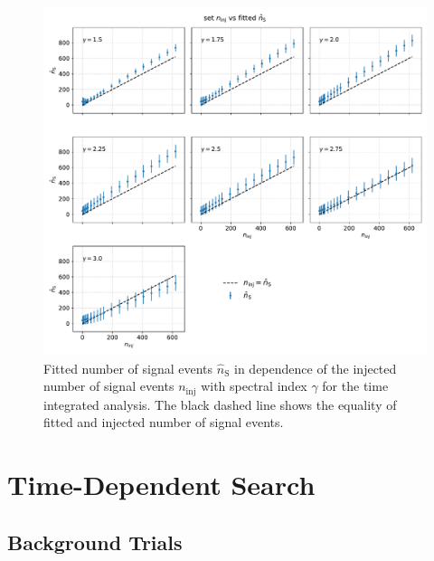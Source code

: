 \begin{figure}
    \centering
    \includegraphics[width=\linewidth]{Plots/05_csky/ns_fit_auto_4.pdf}
    \caption{Fitted number of signal events $\hat{n}_{\text{S}}$ in dependence of the injected number of signal events $n_\text{inj}$ with spectral index $\gamma$ for the time integrated analysis. The black dashed line shows the equality of fitted and injected number of signal events.}
    \label{fig:fit_bias_ns}
\end{figure}

\chapter{Time-Dependent Search}

\section{Background Trials}

